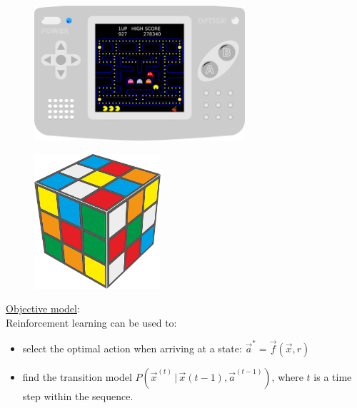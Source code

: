 \begin{frame}
    
    \begin{figure}[h]
        \centering
        \includegraphics[height=5cm]{img/handheld-game-console-2134571_640}
    \end{figure}
    

\end{frame}

\begin{frame}
    \begin{figure}[h]
        \centering
        \includegraphics[height=5cm]{img/babyrajeshraj-1087832_640}
    \end{figure}
    

\end{frame}

\begin{frame}

\underline{Objective model}:\\
Reinforcement learning can be used to:
\begin{itemize}
\item select the optimal action when arriving at a state: $\vec a^* = \vec f(\vec x, r)$
\item find the transition model $P(\vec x^{(t)}\,|\,\vec x{(t-1)}, \vec a^{(t-1)})$, where $t$ is a time step within the sequence.
\end{itemize}
\pause
{}

\end{frame}


